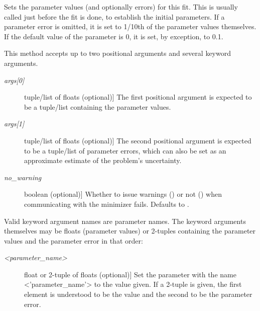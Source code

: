 \documentclass[a4paper,10pt,english]{sphinxmanual}
\begin{document}
\begin{fulllineitems}
\begin{fulllineitems}
\end{fulllineitems}


\begin{fulllineitems}
\label{index:kafe.fit.Fit.set_parameters}
Sets the parameter values (and optionally errors) for this fit.
This is usually called just before the fit is done, to establish
the initial parameters. If a parameter error is omitted, it is
set to 1/10th of the parameter values themselves. If the default
value of the parameter is 0, it is set, by exception, to 0.1.

This method accepts up to two positional arguments and several
keyword arguments.
\begin{description}
\item[{\emph{args{[}0{]}}}] \leavevmode{[}tuple/list of floats (optional){]}
The first positional argument is expected to be
a tuple/list containing the parameter values.

\item[{\emph{args{[}1{]}}}] \leavevmode{[}tuple/list of floats (optional){]}
The second positional argument is expected to be a
tuple/list of parameter errors, which can also be set as an
approximate estimate of the problem's uncertainty.

\item[{\emph{no\_warning}}] \leavevmode{[}boolean (optional){]}
Whether to issue warnings () or not () when
communicating with the minimizer fails. Defaults to .

\end{description}

Valid keyword argument names are parameter names. The keyword arguments
themselves may be floats (parameter values) or 2-tuples containing the
parameter values and the parameter error in that order:
\begin{description}
\item[{\emph{\textless{}parameter\_name\textgreater{}}}] \leavevmode{[}float or 2-tuple of floats (optional){]}
Set the parameter with the name \textless{}'parameter\_name'\textgreater{} to the value
given. If a 2-tuple is given, the first element is understood
to be the value and the second to be the parameter error.

\end{description}

\end{fulllineitems}


\end{fulllineitems}
\end{document}
